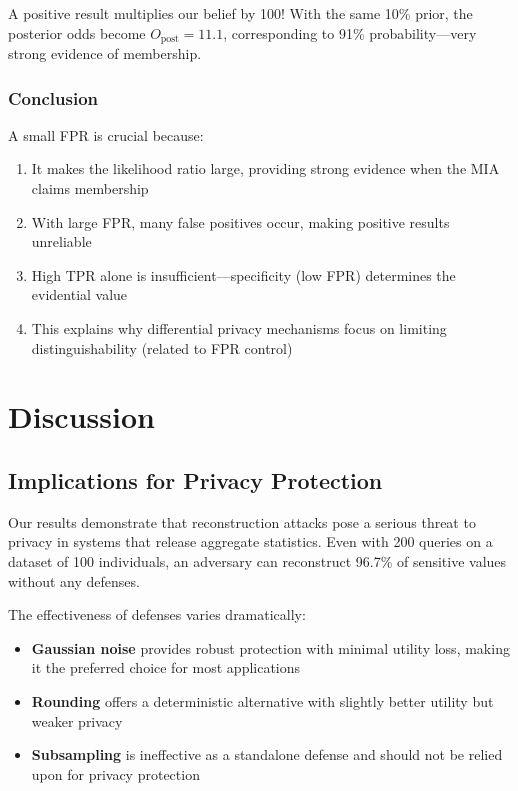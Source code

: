 \documentclass[11pt,letterpaper]{article}
\begin{document}
A positive result multiplies our belief by 100! With the same 10\% prior, the posterior odds become $O_{\text{post}} = 11.1$, corresponding to 91\% probability---very strong evidence of membership.

\subsubsection{Conclusion}

A small FPR is crucial because:

\begin{enumerate}[leftmargin=*]
    \item It makes the likelihood ratio large, providing strong evidence when the MIA claims membership
    \item With large FPR, many false positives occur, making positive results unreliable
    \item High TPR alone is insufficient---specificity (low FPR) determines the evidential value
    \item This explains why differential privacy mechanisms focus on limiting distinguishability (related to FPR control)
\end{enumerate}

\section{Discussion}

\subsection{Implications for Privacy Protection}

Our results demonstrate that reconstruction attacks pose a serious threat to privacy in systems that release aggregate statistics. Even with 200 queries on a dataset of 100 individuals, an adversary can reconstruct 96.7\% of sensitive values without any defenses.

The effectiveness of defenses varies dramatically:

\begin{itemize}[leftmargin=*]
    \item \textbf{Gaussian noise} provides robust protection with minimal utility loss, making it the preferred choice for most applications
    \item \textbf{Rounding} offers a deterministic alternative with slightly better utility but weaker privacy
    \item \textbf{Subsampling} is ineffective as a standalone defense and should not be relied upon for privacy protection
\end{itemize}
\end{document}
